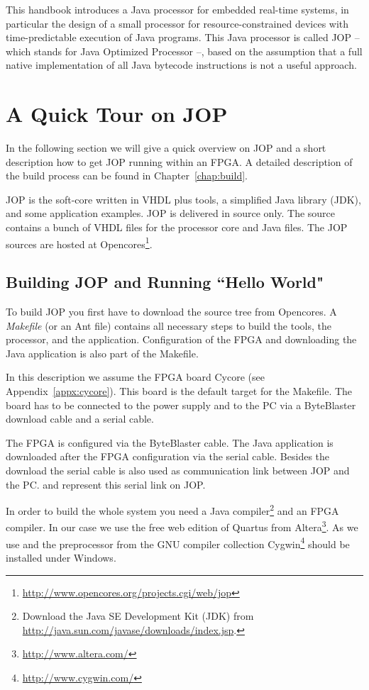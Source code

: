 

This handbook introduces a Java processor for embedded real-time
systems, in particular the design of a small processor for
resource-constrained devices with time-predictable execution of Java
programs. This Java processor is called JOP -- which stands for Java
Optimized Processor --, based on the assumption that a full native
implementation of all Java bytecode instructions is not a useful
approach.

\section{A Quick Tour on JOP}

In the following section we will give a quick overview on JOP and a
short description how to get JOP running within an FPGA. A detailed
description of the build process can be found in
Chapter~\ref{chap:build}.

JOP is the soft-core written in VHDL plus tools, a simplified Java
library (JDK), and some application examples. JOP is delivered in
source only. The source contains a bunch of VHDL files for the
processor core and Java files. The JOP sources are hosted at
Opencores\footnote{\url{http://www.opencores.org/projects.cgi/web/jop}}.


\subsection{Building JOP and Running ``Hello World"}

To build JOP you first have to download the source tree from
Opencores. A \emph{Makefile} (or an Ant file) contains all necessary
steps to build the tools, the processor, and the application.
Configuration of the FPGA and downloading the Java application is
also part of the Makefile.

In this description we assume the FPGA board Cycore (see
Appendix~\ref{appx:cycore}). This board is the default target for
the Makefile. The board has to be connected to the power supply and
to the PC via a ByteBlaster download cable and a serial cable.

The FPGA is configured via the ByteBlaster cable. The Java
application is downloaded after the FPGA configuration via the
serial cable. Besides the download the serial cable is also used as
communication link between JOP and the PC.  and
 represent this serial link on JOP.

In order to build the whole system you need a Java
compiler\footnote{Download the Java SE Development Kit (JDK) from
\url{http://java.sun.com/javase/downloads/index.jsp}.} and an FPGA
compiler. In our case we use the free web edition of Quartus from
Altera\footnote{\url{http://www.altera.com/}}. As we use 
and the preprocessor from the GNU compiler collection
Cygwin\footnote{\url{http://www.cygwin.com/}} should be installed
under Windows.

